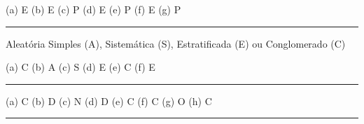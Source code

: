 \documentclass[a4paper,11pt,fleqn]{article}\usepackage[]{graphicx}\usepackage[]{color}
\theoremstyle{definition}
\begin{document}
\begin{compactenum}[2.]
\item (a) E \quad (b) E \quad (c) P \quad (d) E \quad (e) P \quad (f)
  E \quad (g) P
\end{compactenum}

\vspace{0.3cm}
\hrule
\vspace{0.3cm}

\begin{compactenum}[3.]
\item Aleatória Simples (A), Sistemática (S), Estratificada (E) ou
  Conglomerado (C)
  \begin{compactenum}
  \item[] (a) C \quad (b) A \quad (c) S \quad (d) E \quad (e) C \quad
    (f) E
  \end{compactenum}
\end{compactenum}

\vspace{0.3cm}
\hrule
\vspace{0.3cm}

\begin{compactenum}[4.]
\item (a) C \quad (b) D \quad (c) N \quad (d) D \quad (e) C \quad (f) C
  \quad (g) O \quad (h) C \quad
\end{compactenum}

\vspace{0.3cm}
\hrule
\vspace{0.3cm}
\end{document}
